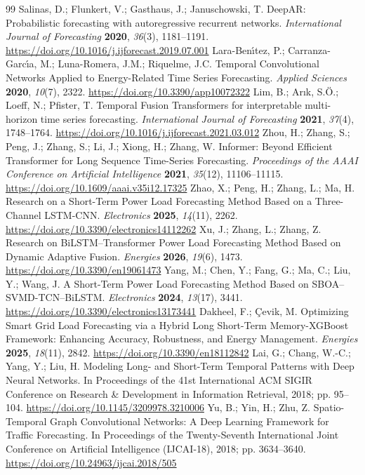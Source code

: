 \documentclass[electronics,article,submit,moreauthors]{Definitions/mdpi}
\begin{document}
\begin{thebibliography}{99}
 Salinas, D.; Flunkert, V.; Gasthaus, J.; Januschowski, T. DeepAR: Probabilistic forecasting with autoregressive recurrent networks. \emph{International Journal of Forecasting} \textbf{2020}, \emph{36}(3), 1181--1191. \url{https://doi.org/10.1016/j.ijforecast.2019.07.001}
 Lara-Ben\'{\i}tez, P.; Carranza-Garc\'{\i}a, M.; Luna-Romera, J.M.; Riquelme, J.C. Temporal Convolutional Networks Applied to Energy-Related Time Series Forecasting. \emph{Applied Sciences} \textbf{2020}, \emph{10}(7), 2322. \url{https://doi.org/10.3390/app10072322}
 Lim, B.; Ar\i{}k, S.\"{O}.; Loeff, N.; Pfister, T. Temporal Fusion Transformers for interpretable multi-horizon time series forecasting. \emph{International Journal of Forecasting} \textbf{2021}, \emph{37}(4), 1748--1764. \url{https://doi.org/10.1016/j.ijforecast.2021.03.012}
 Zhou, H.; Zhang, S.; Peng, J.; Zhang, S.; Li, J.; Xiong, H.; Zhang, W. Informer: Beyond Efficient Transformer for Long Sequence Time-Series Forecasting. \emph{Proceedings of the AAAI Conference on Artificial Intelligence} \textbf{2021}, \emph{35}(12), 11106--11115. \url{https://doi.org/10.1609/aaai.v35i12.17325}
 Zhao, X.; Peng, H.; Zhang, L.; Ma, H. Research on a Short-Term Power Load Forecasting Method Based on a Three-Channel LSTM-CNN. \emph{Electronics} \textbf{2025}, \emph{14}(11), 2262. \url{https://doi.org/10.3390/electronics14112262}
 Xu, J.; Zhang, L.; Zhang, Z. Research on BiLSTM--Transformer Power Load Forecasting Method Based on Dynamic Adaptive Fusion. \emph{Energies} \textbf{2026}, \emph{19}(6), 1473. \url{https://doi.org/10.3390/en19061473}
 Yang, M.; Chen, Y.; Fang, G.; Ma, C.; Liu, Y.; Wang, J. A Short-Term Power Load Forecasting Method Based on SBOA--SVMD-TCN--BiLSTM. \emph{Electronics} \textbf{2024}, \emph{13}(17), 3441. \url{https://doi.org/10.3390/electronics13173441}
 Dakheel, F.; \c{C}evik, M. Optimizing Smart Grid Load Forecasting via a Hybrid Long Short-Term Memory-XGBoost Framework: Enhancing Accuracy, Robustness, and Energy Management. \emph{Energies} \textbf{2025}, \emph{18}(11), 2842. \url{https://doi.org/10.3390/en18112842}
 Lai, G.; Chang, W.-C.; Yang, Y.; Liu, H. Modeling Long- and Short-Term Temporal Patterns with Deep Neural Networks. In Proceedings of the 41st International ACM SIGIR Conference on Research \& Development in Information Retrieval, 2018; pp. 95--104. \url{https://doi.org/10.1145/3209978.3210006}
 Yu, B.; Yin, H.; Zhu, Z. Spatio-Temporal Graph Convolutional Networks: A Deep Learning Framework for Traffic Forecasting. In Proceedings of the Twenty-Seventh International Joint Conference on Artificial Intelligence (IJCAI-18), 2018; pp. 3634--3640. \url{https://doi.org/10.24963/ijcai.2018/505}

\end{thebibliography}
\end{document}
